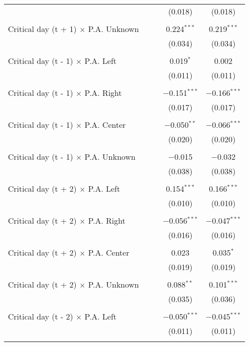 \documentclass[
]{article}
\begin{document}
\begin{table}[!htbp]
{\begin{tabular}{@{\extracolsep{5pt}}lcccc}
  &  &  & (0.018) & (0.018) \\ 
  & & & & \\ 
 Critical day (t + 1) $\times$ P.A. Unknown &  &  & 0.224$^{***}$ & 0.219$^{***}$ \\ 
  &  &  & (0.034) & (0.034) \\ 
  & & & & \\ 
 Critical day (t - 1) $\times$ P.A. Left &  &  & 0.019$^{*}$ & 0.002 \\ 
  &  &  & (0.011) & (0.011) \\ 
  & & & & \\ 
 Critical day (t - 1) $\times$ P.A. Right &  &  & $-$0.151$^{***}$ & $-$0.166$^{***}$ \\ 
  &  &  & (0.017) & (0.017) \\ 
  & & & & \\ 
 Critical day (t - 1) $\times$ P.A. Center &  &  & $-$0.050$^{**}$ & $-$0.066$^{***}$ \\ 
  &  &  & (0.020) & (0.020) \\ 
  & & & & \\ 
 Critical day (t - 1) $\times$ P.A. Unknown &  &  & $-$0.015 & $-$0.032 \\ 
  &  &  & (0.038) & (0.038) \\ 
  & & & & \\ 
 Critical day (t + 2) $\times$ P.A. Left &  &  & 0.154$^{***}$ & 0.166$^{***}$ \\ 
  &  &  & (0.010) & (0.010) \\ 
  & & & & \\ 
 Critical day (t + 2) $\times$ P.A. Right &  &  & $-$0.056$^{***}$ & $-$0.047$^{***}$ \\ 
  &  &  & (0.016) & (0.016) \\ 
  & & & & \\ 
 Critical day (t + 2) $\times$ P.A. Center &  &  & 0.023 & 0.035$^{*}$ \\ 
  &  &  & (0.019) & (0.019) \\ 
  & & & & \\ 
 Critical day (t + 2) $\times$ P.A. Unknown &  &  & 0.088$^{**}$ & 0.101$^{***}$ \\ 
  &  &  & (0.035) & (0.036) \\ 
  & & & & \\ 
 Critical day (t - 2) $\times$ P.A. Left &  &  & $-$0.050$^{***}$ & $-$0.045$^{***}$ \\ 
  &  &  & (0.011) & (0.011) \\ 
  & & & & \\ 

\end{tabular}}
\end{table}
\end{document}
